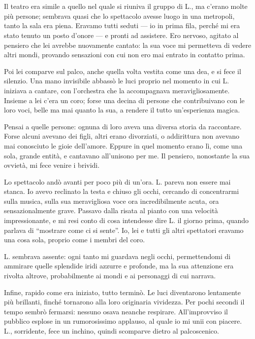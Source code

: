 \chapter{}
\label{ch:4}

Il teatro era simile a quello nel quale si riuniva il gruppo di L., ma c'erano molte più persone;
sembrava quasi che lo spettacolo avesse luogo in una metropoli, tanto la sala era piena. Eravamo
tutti seduti --- io in prima fila, perché mi era stato tenuto un posto d'onore --- e pronti ad
assistere. Ero nervoso, agitato al pensiero che lei avrebbe nuovamente cantato: la sua voce mi
permetteva di vedere altri mondi, provando sensazioni con cui non ero mai entrato in contatto prima.

Poi lei comparve sul palco, anche quella volta vestita come una dea, e si fece il silenzio. Una mano
invisibile abbassò le luci proprio nel momento in cui L. iniziava a cantare, con l'orchestra che la
accompagnava meravigliosamente. Insieme a lei c'era un coro; forse una decina di persone che
contribuivano con le loro voci, belle ma mai quanto la sua, a rendere il tutto un'esperienza magica.

Pensai a quelle persone: ognuna di loro aveva una diversa storia da raccontare. Forse alcuni avevano
dei figli, altri erano divorziati, o addirittura non avevano mai conosciuto le gioie dell'amore.
Eppure in quel momento erano lì, come una sola, grande entità, e cantavano all'unisono per me. Il
pensiero, nonostante la sua ovvietà, mi fece venire i brividi.

Lo spettacolo andò avanti per poco più di un'ora. L. pareva non essere mai stanca. Io avevo
reclinato la testa e chiuso gli occhi, cercando di concentrarmi sulla musica, sulla sua meravigliosa
voce ora incredibilmente acuta, ora sensazionalmente grave. Passavo dalla risata al pianto con una
velocità impressionante, e mi resi conto di cosa intendesse dire L. il giorno prima, quando parlava
di ``mostrare come ci si sente''. Io, lei e tutti gli altri spettatori eravamo una cosa sola,
proprio come i membri del coro.

L. sembrava assente: ogni tanto mi guardava negli occhi, permettendomi di ammirare quelle splendide
iridi azzurre e profonde, ma la sua attenzione era rivolta altrove, probabilmente ai mondi e ai
personaggi di cui narrava.

Infine, rapido come era iniziato, tutto terminò. Le luci diventarono lentamente più brillanti,
finché tornarono alla loro originaria vividezza. Per pochi secondi il tempo sembrò fermarsi: nessuno
osava neanche respirare. All'improvviso il pubblico esplose in un rumorosissimo applauso, al quale
io mi unii con piacere. L., sorridente, fece un inchino, quindi scomparve dietro al palcoscenico.

